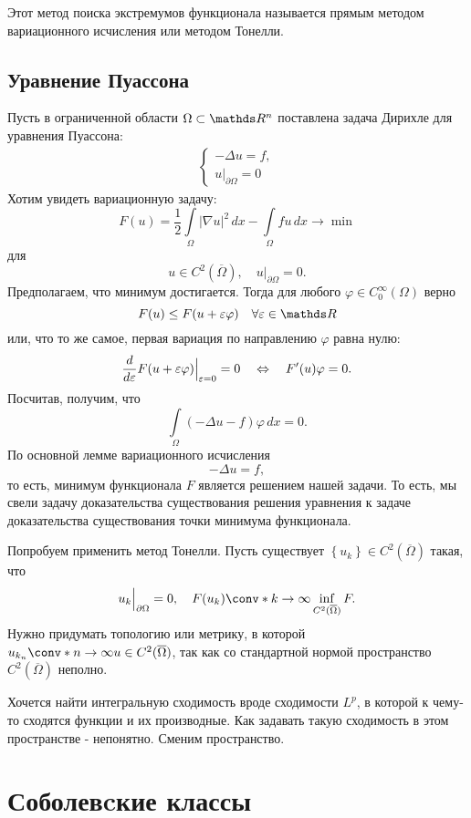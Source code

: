 Этот метод поиска экстремумов функционала называется прямым методом вариационного исчисления или методом Тонелли.

\subsection{Уравнение Пуассона}

Пусть в ограниченной области $\Omega \subset \real^n$ поставлена задача Дирихле для уравнения Пуассона:
\begin{align*}
	\begin{cases*}
		- \Delta u =f, \\
		u\Big\rvert_{\partial \Omega} = 0
	\end{cases*}
\end{align*} 
Хотим увидеть вариационную задачу:
$$ F(u) = \frac {1} {2} \int \limits_\Omega | \nabla u |^2 \, dx - \int \limits_\Omega fu \, dx \rightarrow \min$$ для
$$ u \in C^2(\overline{\Omega}), \quad u\Big\rvert_{\partial \Omega}=0.$$
Предполагаем, что минимум достигается. Тогда для любого $\varphi \in C_0^\infty (\Omega)$ верно
$$F(u) \leq F(u + \eps \varphi) \quad \forall \eps \in \real$$
или, что то же самое, первая вариация по направлению $\varphi$ равна нулю:
$$ \frac {d} {d \varepsilon} F(u + \varepsilon \varphi)\Big\rvert_{\varepsilon=0} = 0 \quad \Leftrightarrow \quad F'(u) \varphi = 0.$$
Посчитав, получим, что $$ \int \limits_\Omega (- \Delta u - f) \varphi \, dx = 0.$$
По основной лемме вариационного исчисления
$$ - \Delta u = f,$$
то есть, минимум функционала $F$ является решением нашей задачи. То есть, мы свели задачу доказательства существования решения уравнения к задаче доказательства существования точки минимума функционала.

Попробуем применить метод Тонелли. Пусть существует $\left\{ u_k \right\} \in C^2(\overline{\Omega})$ такая, что
$$ u_k\Big\rvert_{\partial \Omega} = 0, \quad F(u_k) \conv* {} {k \to \infty} \inf_{C^2(\overline{\Omega})} F.$$
Нужно придумать топологию или метрику, в которой $u_{k_n} \conv*{}{n \to \infty} u \in C^2(\overline{\Omega})$, так как со стандартной нормой пространство $C^2(\overline{\Omega})$ неполно.

Хочется найти интегральную сходимость вроде сходимости $L^p$, в которой к чему-то сходятся функции и их производные. Как задавать такую сходимость в этом пространстве - непонятно. Сменим пространство.

\section{Соболевcкие классы}

